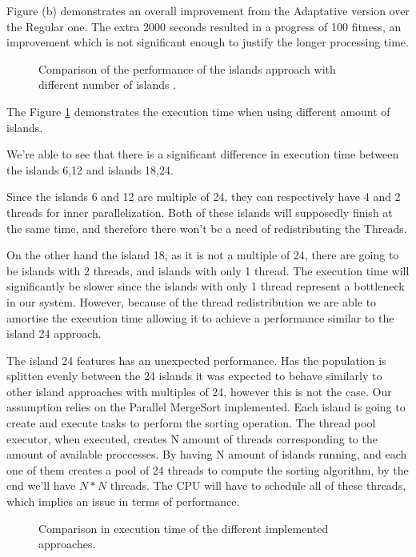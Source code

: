 \documentclass[runningheads]{llncs}
\begin{document}
Figure (b) demonstrates an overall improvement from the Adaptative version over the Regular one. The extra 2000 seconds resulted in a progress of 100 fitness, an improvement which is not significant enough to justify the longer processing time.

\begin{figure}[H]
\centering
{}
\caption{Comparison of the performance of the islands approach with different number of islands .} \label{comparacaoilhas}
\end{figure}

The Figure \ref{comparacaoilhas} demonstrates the execution time when using different amount of islands.

We're able to see that there is a significant difference in execution time between the islands 6,12 and islands 18,24. 

Since the islands 6 and 12 are multiple of 24, they can respectively have 4 and 2 threads for inner parallelization. Both of these islands will supposedly finish at the same time, and therefore there won't be a need of redistributing the Threads.

On the other hand the island 18, as it is not a multiple of 24, there are going to be islands with 2 threads, and islands with only 1 thread. The execution time will significantly be slower since the islands with only 1 thread represent a bottleneck in our system. However, because of the thread redistribution we are able to amortise the execution time allowing it to achieve a performance similar to the island 24 approach.

The island 24 features has an unexpected performance. Has the population is splitten evenly between the 24 islands it was expected to behave similarly to other island approaches with multiples of 24, however this is not the case. Our assumption relies on the Parallel MergeSort implemented. Each island is going to create and execute tasks to perform the sorting operation. The thread pool executor, when executed, creates N amount of threads corresponding to the amount of available proccesses. By having N amount of islands running, and each one of them creates a pool of 24 threads to compute the sorting algorithm, by the end we'll have $N*N$ threads. The CPU will have to schedule all of these threads, which implies an issue in terms of performance.

\begin{figure}[H]
\centering
{}%
\qquad
{}%
\caption{Comparison in execution time of the different implemented approaches.} \label{comparacaolinear}
\label{comparacaoImpl}%
\end{figure}
\end{document}
